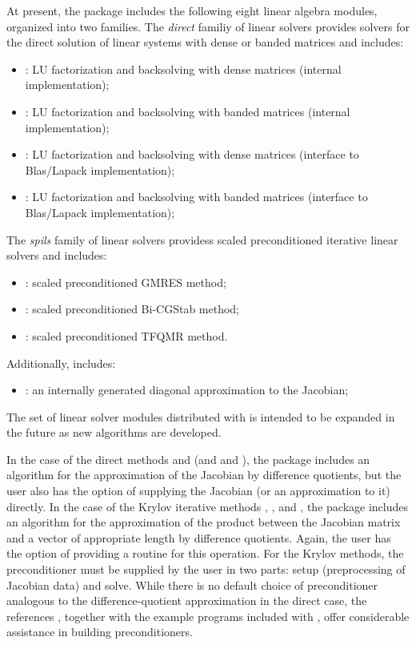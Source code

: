 At present, the package includes the following eight {\cvodes} linear algebra
modules, organized into two families. The {\em direct} familiy of linear
solvers provides solvers for the direct solution of linear systems with
dense or banded matrices and includes:
\begin{itemize} 
\item {\cvdense}: LU factorization and backsolving with dense matrices (internal implementation); 
\item {\cvband}: LU factorization and backsolving with banded matrices (internal implementation); 
\item {\cvlapdense}: LU factorization and backsolving with dense matrices (interface to Blas/Lapack implementation); 
\item {\cvlapband}: LU factorization and backsolving with banded matrices (interface to Blas/Lapack implementation); 
\end{itemize}
The {\em spils} family of linear solvers providess scaled preconditioned
iterative linear solvers and includes:
\begin{itemize} 
\item {\cvspgmr}: scaled preconditioned GMRES method;
\item {\cvspbcg}: scaled preconditioned Bi-CGStab method;
\item {\cvsptfqmr}: scaled preconditioned TFQMR method.
\end{itemize}
Additionally, {\cvode} includes:
\begin{itemize}
\item {\cvdiag}: an internally generated diagonal approximation to the 
  Jacobian; 
\end{itemize}
The set of linear solver modules distributed with {\cvodes} is intended to be expanded in the
future as new algorithms are developed.

In the case of the direct methods {\cvdense} and {\cvband} (and {\cvlapdense} and {\cvlapband}),
the package includes an algorithm for the approximation of the Jacobian by difference
quotients, but the user also has the option of supplying the Jacobian
(or an approximation to it) directly.  In the case of the Krylov iterative
methods {\cvspgmr}, {\cvspbcg}, and {\cvsptfqmr}, the package includes an algorithm
for the approximation of the product between the Jacobian matrix and a vector of
appropriate length by difference quotients. Again, the user has the option of
providing a routine for this operation.
For the Krylov methods, 
the preconditioner must be supplied by the user in two parts: 
setup (preprocessing of Jacobian data) and solve.
While there is no default choice of
preconditioner analogous to the difference-quotient approximation
in the direct case, the references \cite{BrHi:89, Byr:92},
together with the example programs included with {\cvodes}, offer
considerable assistance in building preconditioners.

